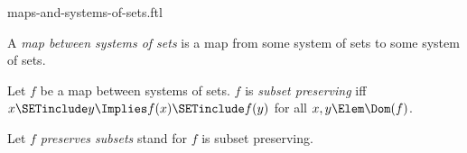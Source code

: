\documentclass{stex}
\begin{document}
\begin{smodule}{maps-and-systems-of-sets.ftl}

\begin{definition}[forthel,id=FOUNDATIONS_10_1394550966845440]
  A \emph{map between systems of sets} is a map from some system of sets to some system of sets.
\end{definition}

\begin{definition}[forthel,id=FOUNDATIONS_10_3290499861446656]
  Let $f$ be a map between systems of sets.
  $f$ is \emph{subset preserving} iff $x \SETinclude y \Implies f(x) \SETinclude f(y)$ for all $x, y \Elem \Dom(f)$.

  Let $f$ \emph{preserves subsets} stand for $f$ is subset preserving.
\end{definition}
\end{smodule}
\end{document}
